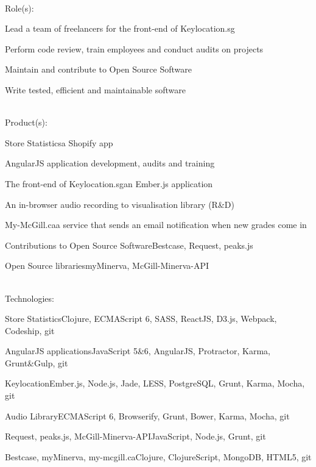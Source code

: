 \documentclass[letterpaper]{deedy-resume} %
\begin{document}


\\[\fpeval{\baseheight*\golden}]

Role(s):

\begin{tightitemize}
    \item Lead a team of freelancers for the front-end of Keylocation.sg
    \item Perform code review, train employees and conduct audits on projects
    \item Maintain and contribute to Open Source Software
    \item Write tested, efficient and maintainable software
\end{tightitemize}

\\[\fpeval{\baseheight*\golden}]

Product(s):
\begin{tightitemize}
    \item Store Statistics\textemdash a Shopify app
    \item AngularJS application development, audits and training
    \item The front-end of Keylocation.sg\textemdash an Ember.js application
    \item An in-browser audio recording to visualisation library (R\&D)
    \item My-McGill.ca\textemdash a service that sends an email notification when new grades come in
    \item Contributions to Open Source Software\textemdash Bestcase, Request, peaks.js
    \item Open Source libraries\textemdash myMinerva, McGill-Minerva-API
\end{tightitemize}

\\[\fpeval{\baseheight*\golden}]

Technologies: \\
\begin{tightitemize}
    \item Store Statistics\textemdash Clojure, ECMAScript 6, SASS, ReactJS, D3.js, Webpack, Codeship, git
    \item AngularJS applications\textemdash JavaScript 5\&6, AngularJS, Protractor, Karma, Grunt\&Gulp, git
    \item Keylocation\textemdash Ember.js, Node.js, Jade, LESS, PostgreSQL, Grunt, Karma, Mocha, git
    \item Audio Library\textemdash ECMAScript 6, Browserify, Grunt, Bower, Karma, Mocha, git
    \item Request, peaks.js, McGill-Minerva-API\textemdash JavaScript, Node.js, Grunt, git
    \item Bestcase, myMinerva, my-mcgill.ca\textemdash Clojure, ClojureScript, MongoDB, HTML5, git
\end{tightitemize}
\end{document}
